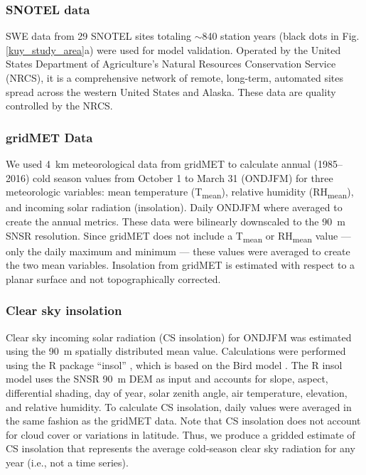 \hypertarget{ch2-do-2}{\subsubsection{SNOTEL data}\label{ch2-do-2}}

SWE data from 29 SNOTEL sites totaling $\sim$840 station years (black dots in Fig. \ref{kuy_study_area}a) were used for model validation. Operated by the United States Department of Agriculture's Natural Resources Conservation Service (NRCS), it is a comprehensive network of remote, long-term, automated sites spread across the western United States and Alaska. These data are quality controlled by the NRCS.

\hypertarget{ch2-do-2}{\subsubsection{gridMET Data}\label{ch2-do-2}}

We used 4~km meteorological data from gridMET \citep{abatzoglouDevelopmentGriddedSurface2013} to calculate annual (1985--2016) cold season values from October 1 to March 31 (ONDJFM) for three meteorologic variables: mean temperature (T\textsubscript{mean}), relative humidity (RH\textsubscript{mean}), and incoming solar radiation (insolation). Daily ONDJFM where averaged to create the annual metrics. These data were bilinearly downscaled to the 90~m SNSR resolution. Since gridMET does not include a T\textsubscript{mean} or RH\textsubscript{mean} value --- only the daily maximum and minimum --- these values were averaged to create the two mean variables. Insolation from gridMET is estimated with respect to a planar surface and not topographically corrected. 

\hypertarget{ch2-do-2}{\subsubsection{Clear sky insolation}\label{ch2-do-2}}

Clear sky incoming solar radiation (CS insolation) for ONDJFM was estimated using the 90~m spatially distributed mean value. Calculations were performed using the R package ``insol” \citep{corripioInsolSolarRadiation2020}, which is based on the Bird model \citep{birdReviewEvaluationImprovement1981}. The R insol model uses the SNSR 90~m DEM as input and accounts for slope, aspect, differential shading, day of year, solar zenith angle, air temperature, elevation, and relative humidity. To calculate CS insolation, daily values were averaged in the same fashion as the gridMET data. Note that CS insolation does not account for cloud cover or variations in latitude. Thus, we produce a gridded estimate of CS insolation that represents the average cold-season clear sky radiation for any year (i.e., not a time series).

